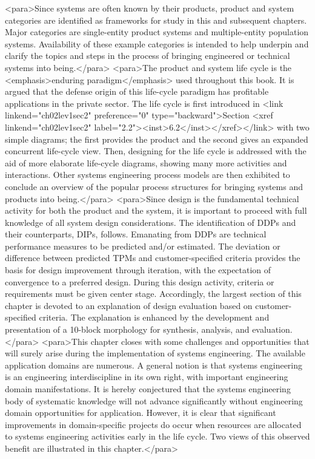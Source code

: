 <para>Since systems are often known by their products, product and system categories are identified as frameworks for study in this and subsequent chapters. Major categories are single-entity product systems and multiple-entity population systems. Availability of these example categories is intended to help underpin and clarify the topics and steps in the process of bringing engineered or technical systems into being.</para>
<para>The product and system life cycle is the <emphasis>enduring paradigm</emphasis> used throughout this book. It is argued that the defense origin of this life-cycle paradigm has profitable applications in the private sector. The life cycle is first introduced in <link linkend="ch02lev1sec2" preference="0" type="backward">Section <xref linkend="ch02lev1sec2" label="2.2"><inst>6.2</inst></xref></link> with two simple diagrams; the first provides the product and the second gives an expanded concurrent life-cycle view. Then, designing for the life cycle is addressed with the aid of more elaborate life-cycle diagrams, showing many more activities and interactions. Other systems engineering process models are then exhibited to conclude an overview of the popular process structures for bringing systems and products into being.</para>
<para>Since design is the fundamental technical activity for both the product and the system, it is important to proceed with full knowledge of all system design considerations. The identification of DDPs and their counterparts, DIPs, follows. Emanating from DDPs are technical performance measures to be predicted and/or estimated. The deviation or difference between predicted TPMs and customer-specified criteria provides the basis for design improvement through iteration, with the expectation of convergence to a preferred design. During this design activity, criteria or requirements must be given center stage. Accordingly, the largest section of this chapter is devoted to an explanation of design evaluation based on customer-specified criteria. The explanation is enhanced by the development and presentation of a 10-block morphology for synthesis, analysis, and evaluation.</para>
<para>This chapter closes with some challenges and opportunities that will surely arise during the implementation of systems engineering. The available application domains are numerous. A general notion is that systems engineering is an engineering interdiscipline in its own right, with important engineering domain manifestations. It is hereby conjectured that the systems engineering body of systematic knowledge will not advance significantly without engineering domain opportunities for application. However, it is clear that significant improvements in domain-specific projects do occur when resources are allocated to systems engineering activities early in the life cycle. Two views of this observed benefit are illustrated in this chapter.</para>

